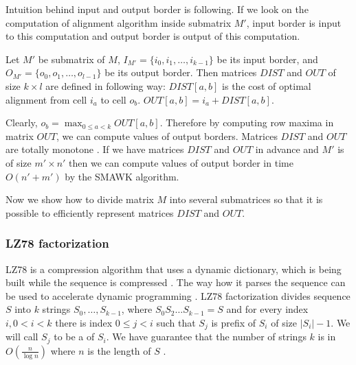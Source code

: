 Intuition behind input and output border is following. If we look on the
computation of alignment algorithm inside submatrix $M'$, input border is input
to this computation and output border is output of this computation.

\begin{definition}\cite{Crochemore2002}
Let $M'$ be submatrix of $M$, $I_{M'}=\{i_0,i_1,\dots,i_{k-1}\}$ be its input
border, and $O_{M'}=\{o_0,o_1,\dots,o_{l-1}\}$ be its output border. Then
matrices
$DIST$ and $OUT$ of size $k\times l$ are defined in following way:
$DIST[a,b]$ is the cost of optimal alignment from cell $i_a$ to cell $o_b$.
$OUT[a,b]=i_a+DIST[a,b]$.
\end{definition}

Clearly, $o_b=\max_{0\leq a < k}OUT[a,b]$. Therefore by computing row maxima in
matrix $OUT$, we can compute values of output borders. Matrices $DIST$ and $OUT$
are totally monotone \cite{Crochemore2002}.  If we have matrices $DIST$ and
$OUT$ in advance and $M'$ is of size $m'\times n'$ then we can compute values of
output border in time $O(n'+m')$ by the SMAWK algorithm.

Now we show how to divide matrix $M$ into several submatrices so that
it is possible to efficiently represent matrices $DIST$ and $OUT$.



\subsubsection{LZ78 factorization}

LZ78 is a compression algorithm that uses a dynamic dictionary, which is being built
while the sequence is compressed \cite{Lempel1976}. The way how it parses the sequence
can be used to accelerate dynamic programming \cite{Crochemore2002,Weimann2009}. 
LZ78 factorization divides
sequence $S$ into $k$ strings $S_0,\dots,S_{k-1}$, where $S_0S_2\dots S_{k-1}=S$ and
for every index  $i,0< i <k$ there is index $0\leq j<i$ such that $S_j$ is
prefix of $S_i$ of size $|S_i|-1$. We will call $S_j$ to be a
 of $S_i$.  We have guarantee that the number of strings
$k$ is in  $O(\frac{n}{\log n})$ where $n$ is the length of $S$
\cite{Lempel1976}. 


